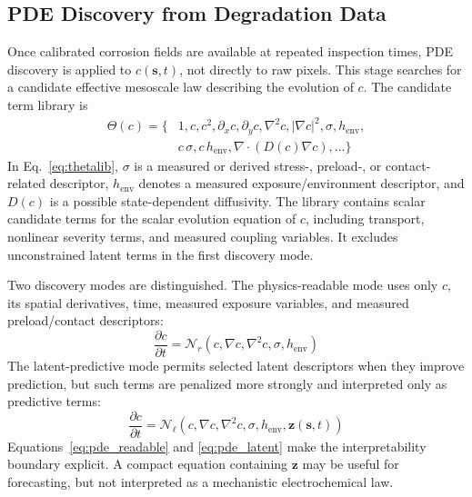 \documentclass[colorlinks,upint,subscriptcorrection,varvw,hyphenate,balance]{asmeconf}
\newcommand{\vect}[1]{\bm{#1}}
\begin{document}
\subsection{PDE Discovery from Degradation Data}
Once calibrated corrosion fields are available at repeated inspection times, PDE discovery is applied to $c(\vect{s},t)$, not directly to raw pixels. This stage searches for a candidate effective mesoscale law describing the evolution of $c$. The candidate term library is
\begin{equation}
\begin{aligned}
\Theta(c)=\{&
1,c,c^2,\partial_x c,\partial_y c,\nabla^2 c,
|\nabla c|^2,\sigma,h_{\mathrm{env}}, \\
&c\,\sigma,c\,h_{\mathrm{env}},
\nabla\cdot(D(c)\nabla c),\ldots
\}
\end{aligned}
\label{eq:thetalib}
\end{equation}
In Eq.~\eqref{eq:thetalib}, $\sigma$ is a measured or derived stress-, preload-, or contact-related descriptor, $h_{\mathrm{env}}$ denotes a measured exposure/environment descriptor, and $D(c)$ is a possible state-dependent diffusivity. The library contains scalar candidate terms for the scalar evolution equation of $c$, including transport, nonlinear severity terms, and measured coupling variables. It excludes unconstrained latent terms in the first discovery mode.

Two discovery modes are distinguished. The physics-readable mode uses only $c$, its spatial derivatives, time, measured exposure variables, and measured preload/contact descriptors:
\begin{equation}
\frac{\partial c}{\partial t}=\mathcal{N}_{r}\left(c,\nabla c,\nabla^2c,\sigma,h_{\mathrm{env}}\right)
\label{eq:pde_readable}
\end{equation}
The latent-predictive mode permits selected latent descriptors when they improve prediction, but such terms are penalized more strongly and interpreted only as predictive terms:
\begin{equation}
\frac{\partial c}{\partial t}=\mathcal{N}_{\ell}\left(c,\nabla c,\nabla^2c,\sigma,h_{\mathrm{env}},\vect{z}(\vect{s},t)\right)
\label{eq:pde_latent}
\end{equation}
Equations~\eqref{eq:pde_readable} and \eqref{eq:pde_latent} make the interpretability boundary explicit. A compact equation containing $\vect{z}$ may be useful for forecasting, but not interpreted as a mechanistic electrochemical law.
\end{document}
